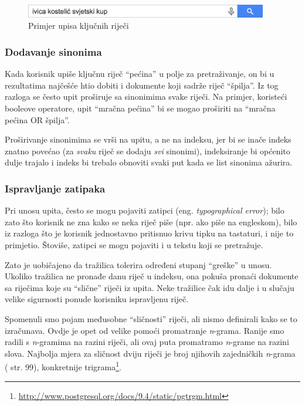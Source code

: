 \documentclass[a4paper,twoside,12pt]{scrreprt}
\begin{document}
\begin{figure}[H]
  \centering
  \includegraphics[width=300pt]{keywords}
  \caption{Primjer upisa ključnih riječi}
  \label{keywords}
\end{figure}

\subsubsection{Dodavanje sinonima}

Kada korisnik upiše ključnu riječ ``pećina'' u polje za pretraživanje, on bi u rezultatima najčešće htio dobiti i dokumente koji sadrže riječ ``špilja''. Iz tog razloga se često upit proširuje sa sinonimima svake riječi. Na primjer, koristeći booleove operatore, upit ``mračna pećina'' bi se mogao proširiti na ``mračna pećina OR špilja''.

Proširivanje sinonimima se vrši na upitu, a ne na indeksu, jer bi se inače indeks znatno povećao (za \textit{svaku} riječ se dodaju \textit{svi} sinonimi), indeksiranje bi općenito dulje trajalo i indeks bi trebalo obnoviti svaki put kada se list sinonima ažurira.

\subsubsection{Ispravljanje zatipaka}

Pri unosu upita, često se mogu pojaviti zatipci (eng. \textit{typographical error}); bilo zato što korisnik ne zna kako se neka riječ piše (npr. ako piše na engleskom), bilo iz razloga što je korisnik jednostavno pritisnuo krivu tipku na tastaturi, i nije to primjetio. Štoviše, zatipci se mogu pojaviti i u tekstu koji se pretražuje.

Zato je uobičajeno da tražilica tolerira određeni stupanj ``greške'' u unosu. Ukoliko tražilica ne pronađe danu riječ u indeksu, ona pokuša pronaći dokumente sa riječima koje su ``slične'' riječi iz upita. Neke tražilice čak idu dalje i u slučaju velike sigurnosti ponude korisniku ispravljenu riječ.

Spomenuli smo pojam međusobne ``sličnosti'' riječi, ali nismo definirali kako se to izračunava. Ovdje je opet od velike pomoći promatranje \textit{n}-grama. Ranije smo radili s \textit{n}-gramima na razini riječi, ali ovaj puta promatramo \textit{n}-grame na razini slova. Najbolja mjera za sličnost dviju riječi je broj njihovih zajedničkih \textit{n}-grama (\cite{taming} str. 99), konkretnije trigrama\footnote{\url{http://www.postgresql.org/docs/9.4/static/pgtrgm.html}}.
\end{document}
